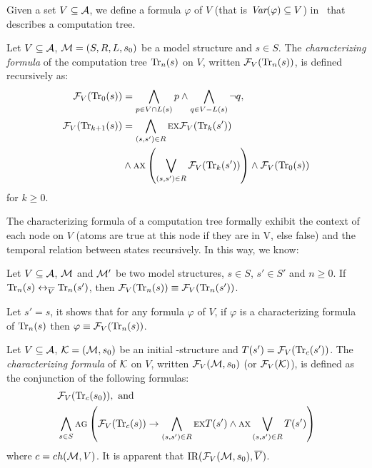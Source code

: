 \documentclass{article}
\begin{document}
Given a set $V\subseteq{\cal A}$, we define a formula $\varphi$ of $V$ (that is $\textit{Var}(\varphi) \subseteq V$) in \CTL\ that describes a computation tree.
\begin{definition}\label{def:V:char:formula}
Let $V\subseteq {\cal A}$, ${\cal M} =(S,R,L,s_0)$ be a model structure and $s\in S$.
The {\em characterizing formula} of the computation tree $\textrm{Tr}_n(s)$ on $V$,
written ${\cal F}_V(\textrm{Tr}_n(s))$, is defined recursively as:
\begin{align*}
   {\cal F}_V(\textrm{Tr}_0(s)) &=  \bigwedge_{p \in V\cap L(s)}p
     \wedge \bigwedge_{q\in V-L(s)} \neg q,\\
   {\cal F}_V(\textrm{Tr}_{k+1}(s))& = \bigwedge_{(s,s')\in R}
    \textsc{e} \textsc{x} {\cal F}_V(\textrm{Tr}_k(s'))\\
  &\wedge
    \textsc{a} \textsc{x} \left( \bigvee_{(s,s')\in R} {\cal F}_V(\textrm{Tr}_k(s')) \right) \wedge {\cal F}_V(\textrm{Tr}_0(s))
\end{align*}
for $k\ge 0$.
\end{definition}
The characterizing formula of a computation tree formally exhibit the context of each node on $V$ (atoms are true at this node if they are in V, else false) and the temporal relation between states recursively. In this way, we know:

\begin{lemma}\label{lem:Vb:TrFormula:Equ}
Let $V\subseteq {\cal A}$, ${\cal M}$ and ${\cal M}'$ be two model structures,
$s\in S$, $s'\in S'$ and $n\ge 0$. If $\textrm{Tr}_n(s) \leftrightarrow_{\overline V} \textrm{Tr}_n(s')$, then ${\cal F}_V(\textrm{Tr}_n(s)) \equiv {\cal F}_V(\textrm{Tr}_n(s'))$.
\end{lemma}
Let $s'=s$, it shows that for any formula $\varphi$ of $V$, if $\varphi$ is a characterizing formula of $\textrm{Tr}_n(s)$ then $\varphi \equiv {\cal F}_V(\textrm{Tr}_n(s))$.



Let $V\subseteq\cal A$,
 ${\cal K}=({\cal M},s_0)$ be an initial \MPK-structure and $T(s') = {\cal F}_V(\textrm{Tr}_c(s'))$.
The {\em characterizing formula} of $\cal K$ on $V$, written ${\cal F}_V({\cal M},s_0)$ (or ${\cal F}_V({\cal K})$), is
defined as the conjunction of the following formulas:
\begin{align*}
  &{\cal F}_V(\textrm{Tr}_c(s_0)), \mbox{ and }\\
  & \bigwedge_{s\in S}\textsc{a} \textsc{g}\left(
    {\cal F}_V(\textrm{Tr}_c(s)) \rightarrow
    \bigwedge_{(s,s')\in R}
        \textsc{e} \textsc{x} T(s')
        \wedge
        \textsc{a} \textsc{x} \bigvee_{(s,s')\in R}T(s')
    \right)
\end{align*}
where $c=ch({\cal M},V)$. It is apparent that $\textrm{IR}({\cal F}_V({\cal M}, s_0), \overline V)$.
\end{document}
